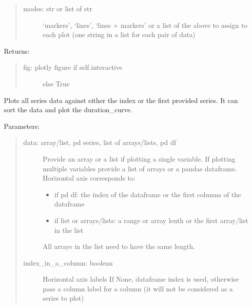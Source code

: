 \documentclass[letterpaper,10pt,english,openany]{sphinxmanual}
\begin{document}
\begin{fulllineitems}
\begin{fulllineitems}
\begin{quote}
\begin{description}
\item[{modes: str or list of str}] \leavevmode
‘markers’, ‘lines’, ‘lines + markers’ or
a list of the above to assign to each plot
(one string in a list for each pair of data)

\end{description}
\end{quote}

Returns:
\begin{quote}
\begin{description}
\item[{fig: plotly figure if self.interactive}] \leavevmode
else True

\end{description}
\end{quote}

\end{fulllineitems}


\begin{fulllineitems}
\label{\detokenize{source/mswh.tools:mswh.tools.plots.Plot.series}}
Plots all series data against either the index or the first
provided series. It can sort the data and plot the duration\_curve.

Parameters:
\begin{quote}
\begin{description}
\item[{data: array/list, pd series, list of arrays/lists, pd df}] \leavevmode
Provide an array or a list if plotting a single
variable. If plotting multiple variables provide
a list of arrays or a pandas dataframe.
Horizontal axis corresponds to:
\begin{itemize}
\item {} 
if pd df: the index of the dataframe or the first columns of the dataframe

\item {} 
if list or arrays/lists: a range or array lenth or the first array/list in the list

\end{itemize}

All arrays in the list need to have the same length.

\item[{index\_in\_a\_column: boolean}] \leavevmode
Horizontal axis labels
If None, dataframe index is used, otherwise pass a
column label for a column (it will not be considered
as a series to plot)


\end{description}
\end{quote}
\end{fulllineitems}
\end{fulllineitems}
\end{document}
